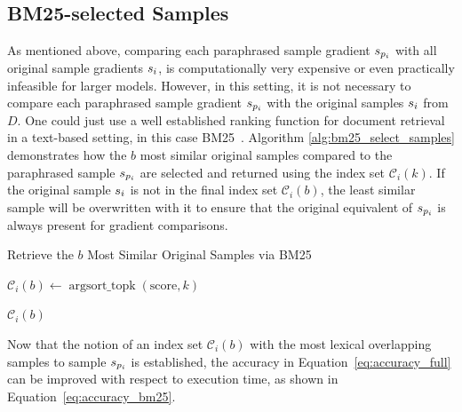 \subsection{BM25-selected Samples}
As mentioned above, comparing each paraphrased sample gradient $s_{p_i}$ with all original sample gradients $s_i$, is computationally very expensive or even practically infeasible for larger models. However, in this setting, it is not necessary to compare each paraphrased sample gradient $s_{p_i}$ with the original samples $s_i$ from $D$. One could just use a well established ranking function for document retrieval in a text-based setting, in this case BM25~\cite{bm25}. 
Algorithm \ref{alg:bm25_select_samples} demonstrates how the $b$ most similar original samples compared to the paraphrased sample $s_{p_i}$ are selected and returned using the index set $\mathcal{C}_i(k)$. If the original sample $s_i$ is not in the final index set $\mathcal{C}_i(b)$, the least similar sample will be overwritten with it to ensure that the original equivalent of $s_{p_i}$ is always present for gradient comparisons.
\begin{algorithm}[ht]
\caption{Retrieve the $b$ Most Similar Original Samples via BM25}
\label{alg:bm25_select_samples}


\DontPrintSemicolon
{}
$\mathcal{C}_i(b) \gets \operatorname{argsort\_topk}(\text{score}, k)$\; 


\Return $\mathcal{C}_i(b)$
\end{algorithm}
Now that the notion of an index set $\mathcal{C}_i(b)$ with the most lexical overlapping samples to sample $s_{p_i}$ is established, the accuracy in Equation~\ref{eq:accuracy_full} can be improved with respect to execution time, as shown in Equation~\ref{eq:accuracy_bm25}. 
